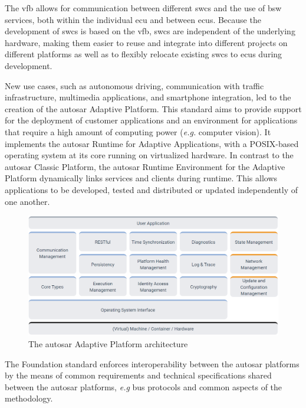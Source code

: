 The \gls{vfb} allows for communication between different \glspl{swc} and the use of \gls{bsw} services, both within the individual \gls{ecu} and between \glspl{ecu}. Because the development of \glspl{swc} is based on the \gls{vfb}, \glspl{swc} are independent of the underlying hardware, making them easier to reuse and integrate into different projects on different platforms as well as to flexibly relocate existing \glspl{swc} to \glspl{ecu} during development.\par

New use cases, such as autonomous driving, communication with traffic infrastructure, multimedia applications, and smartphone integration, led to the creation of the \gls{autosar} Adaptive Platform. This standard aims to provide support for the deployment of customer applications and an environment for applications that require a high amount of computing power (\textit{e.g.} computer vision). It implements the \gls{autosar} Runtime for Adaptive Applications, with a POSIX-based operating system at its core running \citep{autosar_adaptive_os} on virtualized hardware. In contrast to the \gls{autosar} Classic Platform, the \gls{autosar} Runtime Environment for the Adaptive Platform dynamically links services and clients during runtime. This allows applications to be developed, tested and distributed or updated independently of one another.

\begin{figure}
    \centering
    \includegraphics[width = \linewidth]{img/parts/introduction/AUTOSAR Adaptive Platform.png}
    \caption{The \gls{autosar} Adaptive Platform architecture \citep{autosar_adaptive_arch}}
    \label{fig:autosar_adaptive_arch}
\end{figure}

The Foundation standard enforces interoperability between the \gls{autosar} platforms by the means of common requirements and technical specifications shared between the \gls{autosar} platforms, \textit{e.g} bus protocols and common aspects of the methodology.\par

